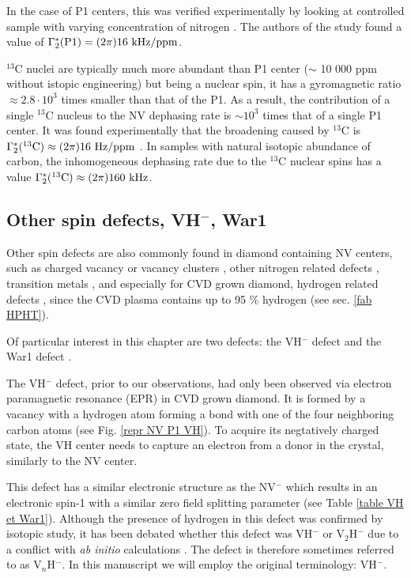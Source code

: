 \documentclass[a4paper, 11pt]{report}
\begin{document}
In the case of P1 centers, this was verified experimentally by looking at controlled sample with varying concentration of nitrogen \citep{bauch2020decoherence}. The authors of the study found a value of $\Gamma_2^*(\rm P1)= (2 \pi) 16\ \rm kHz/ppm$. 

$^{13}$C nuclei are typically much more abundant than P1 center ($\sim$ 10 000 ppm without istopic engineering) but being a nuclear spin, it has a gyromagnetic ratio $\approx 2.8\cdot 10^3$ times smaller than that of the P1. As a result, the contribution of a single $^{13}$C nucleus to the NV dephasing rate is $\sim 10^3$ times that of a single P1 center. It was found experimentally that the broadening caused by $^{13}$C is $\Gamma_2^*(^{13}\rm C ) \approx (2 \pi) 16\ \rm Hz/ppm$ \citep{van1997dependences, barry2020sensitivity}. In samples with natural isotopic abundance of carbon, the inhomogeneous dephasing rate due to the $^{13}$C nuclear spins has a value $\Gamma_2^*(^{13}\rm C ) \approx (2 \pi) 160\ \rm kHz$.

\subsection{Other spin defects, VH$^-$, War1}
\label{other defects}
Other spin defects are also commonly found in diamond containing NV centers, such as charged vacancy or vacancy clusters \citep{hounsome2006origin}, other nitrogen related defects \citep{newton2007epr}, transition metals \citep{isoya1990fourier}, and especially for CVD grown diamond, hydrogen related defects \citep{hartland2014study}, since the CVD plasma contains up to 95 \% hydrogen (see sec. \ref{fab HPHT}).

Of particular interest in this chapter are two defects: the VH$^-$ defect \citep{glover2003hydrogen, glover2004hydrogen} and the War1 defect \citep{cruddace2007magnetic}. 

The VH$^-$ defect, prior to our observations, had only been observed via electron paramagnetic resonance (EPR) in CVD grown diamond. It is formed by a vacancy with a hydrogen atom forming a bond with one of the four neighboring carbon atoms (see Fig. \ref{repr NV P1 VH}). To acquire its negtatively charged state, the VH center needs to capture an electron from a donor in the crystal, similarly to the NV center. 

This defect has a similar electronic structure as the NV$^-$ which results in an electronic spin-1 with a similar zero field splitting parameter (see Table \ref{table VH et War1}). Although the presence of hydrogen in this defect was confirmed by isotopic study, it has been debated whether this defect was VH$^-$ or V$_2$H$^-$ due to a conflict with \textit{ab initio} calculations \citep{shaw2005importance}. The defect is therefore sometimes referred to as V$_n$H$^-$. In this manuscript we will employ the original terminology: VH$^-$.
\end{document}
